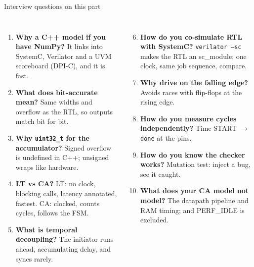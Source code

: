 \documentclass[aspectratio=169,11pt]{beamer}
\newcommand{\sig}[1]{\texttt{#1}}
\begin{document}
\begin{frame}{Interview questions on this part}
  \scriptsize
  \begin{columns}[T]
    \begin{enumerate}
      \item \textbf{Why a C++ model if you have NumPy?} It links into SystemC, Verilator and a UVM
            scoreboard (DPI-C), and it is fast.
      \item \textbf{What does bit-accurate mean?} Same widths and overflow as the RTL, so outputs match
            bit for bit.
      \item \textbf{Why \sig{uint32\_t} for the accumulator?} Signed overflow is undefined in C++;
            unsigned wraps like hardware.
      \item \textbf{LT vs CA?} LT: no clock, blocking calls, latency annotated, fastest. CA: clocked,
            counts cycles, follows the FSM.
      \item \textbf{What is temporal decoupling?} The initiator runs ahead, accumulating delay, and
            syncs rarely.
    \end{enumerate}
    \begin{enumerate}\setcounter{enumi}{5}
      \item \textbf{How do you co-simulate RTL with SystemC?} \sig{verilator --sc} makes the RTL an
            sc\_module; one clock, same job sequence, compare.
      \item \textbf{Why drive on the falling edge?} Avoids races with flip-flops at the rising edge.
      \item \textbf{How do you measure cycles independently?} Time START $\to$ \sig{done} at the pins.
      \item \textbf{How do you know the checker works?} Mutation test: inject a bug, see it caught.
      \item \textbf{What does your CA model not model?} The datapath pipeline and RAM timing; and
            PERF\_IDLE is excluded.
    \end{enumerate}
  \end{columns}
\end{frame}
\end{document}
